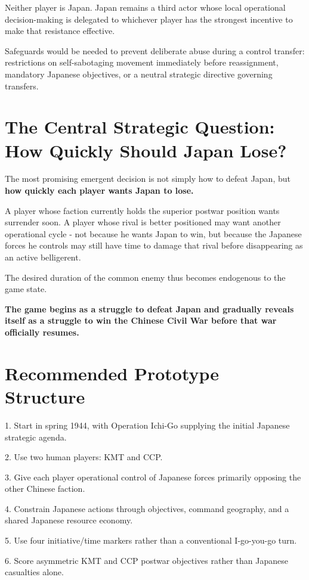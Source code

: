 \documentclass[11pt]{article}
\begin{document}
Neither player is Japan. Japan remains a third actor whose local operational decision-making is delegated to whichever player has the strongest incentive to make that resistance effective.


Safeguards would be needed to prevent deliberate abuse during a control transfer: restrictions on self-sabotaging movement immediately before reassignment, mandatory Japanese objectives, or a neutral strategic directive governing transfers.


\section{The Central Strategic Question: How Quickly Should Japan Lose?}
The most promising emergent decision is not simply how to defeat Japan, but \textbf{how quickly each player wants Japan to lose.}


A player whose faction currently holds the superior postwar position wants surrender soon. A player whose rival is better positioned may want another operational cycle - not because he wants Japan to win, but because the Japanese forces he controls may still have time to damage that rival before disappearing as an active belligerent.


The desired duration of the common enemy thus becomes endogenous to the game state.


\textbf{The game begins as a struggle to defeat Japan and gradually reveals itself as a struggle to win the Chinese Civil War before that war officially resumes.}


\section{Recommended Prototype Structure}
1. Start in spring 1944, with Operation Ichi-Go supplying the initial Japanese strategic agenda.


2. Use two human players: KMT and CCP.


3. Give each player operational control of Japanese forces primarily opposing the other Chinese faction.


4. Constrain Japanese actions through objectives, command geography, and a shared Japanese resource economy.


5. Use four initiative/time markers rather than a conventional I-go-you-go turn.


6. Score asymmetric KMT and CCP postwar objectives rather than Japanese casualties alone.
\end{document}
